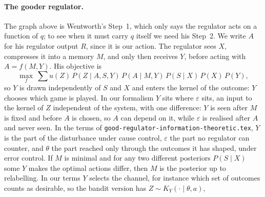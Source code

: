 \documentclass[11pt]{article}
\theoremstyle{remark}
\newcommand{\1}{\mathds{1}}
\begin{document}
\paragraph{The gooder regulator.}
The graph above is Wentworth's Step~1, which only says the regulator acts on a function of $q$; to see when it must carry $q$ itself we need his Step~2.
We write $A$ for his regulator output $R$, since it is our action.
The regulator sees $X$, compresses it into a memory $M$, and only then receives $Y$, before acting with $A=f(M,Y)$.
His objective is
\begin{equation}
  \max_{f}\ \sum u(Z)\,P(Z\mid A,S,Y)\,P(A\mid M,Y)\,P(S\mid X)\,P(X)\,P(Y),
  \label{eq:gooder}
\end{equation}
so $Y$ is drawn independently of $S$ and $X$ and enters the kernel of the outcome: $Y$ chooses which game is played.
In our formalism $Y$ sits where $\varepsilon$ sits, an input to the kernel of $Z$ independent of the system, with one difference: $Y$ is seen after $M$ is fixed and before $A$ is chosen, so $A$ can depend on it, while $\varepsilon$ is realised after $A$ and never seen.
In the terms of \nolinkurl{good-regulator-information-theoretic.tex}, $Y$ is the part of the disturbance under cause control, $\varepsilon$ the part no regulator can counter, and $\theta$ the part reached only through the outcomes it has shaped, under error control.
If $M$ is minimal and for any two different posteriors $P(S\mid X)$ some $Y$ makes the optimal actions differ, then $M$ is the posterior up to relabelling.
In our terms $Y$ selects the channel, for instance which set of outcomes counts as desirable, so the bandit version has $Z\sim K_Y(\cdot\mid\theta,a)$,
\begin{center}
\hspace{16mm}
\end{center}
\end{document}
